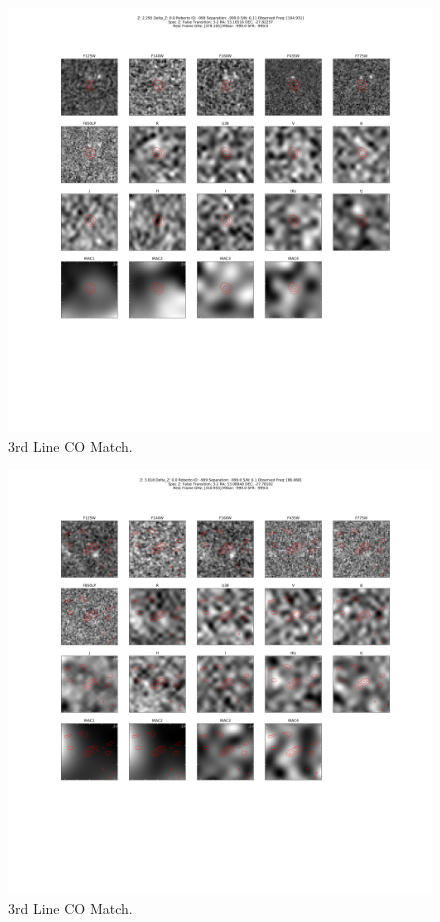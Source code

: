 \begin{figure}[tbp]
\centering \includegraphics[width=120mm]{Matched/ASPECS_Cutout_3.png}
\caption{3rd Line CO Match.}
\label{fig:Match_Three}
\end{figure}

\begin{figure}[tbp]
\centering \includegraphics[width=120mm]{Matched/ASPECS_Cutout_4.png}
\caption{3rd Line CO Match.}
\label{fig:Match_Three}
\end{figure}

